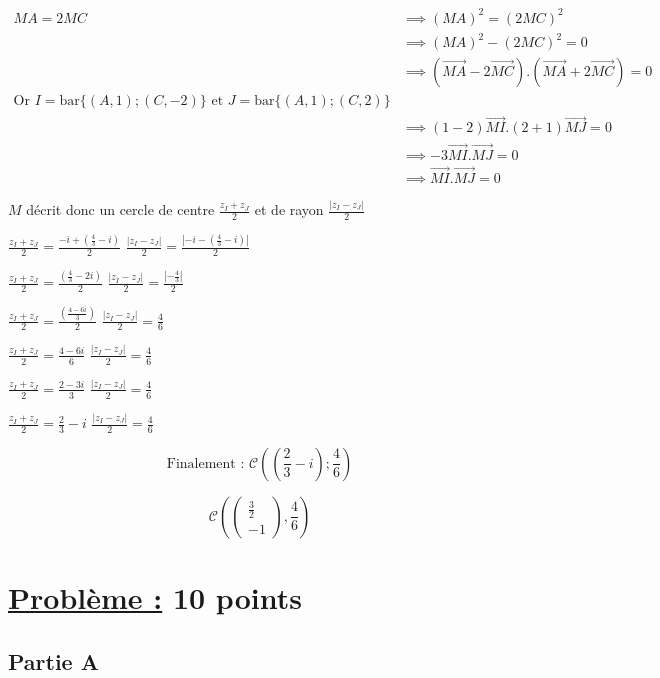 \documentclass[12pt,a4paper]{article}
\begin{document}
\begin{enumerate}
\begin{align*}
MA =2MC &\implies (MA)^{2} =(2MC)^{2}\\
				&\implies (MA)^{2} -(2MC)^{2}=0\\
				&\implies (\overrightarrow{MA} - 2\overrightarrow{MC}).(\overrightarrow{MA} + 2\overrightarrow{MC}) = 0\\
\text{Or }  I = \text{bar}\{(A,1); (C,-2)\} \text{ et } J = \text{bar}\{(A,1); (C,2)\}\\
				&\implies (1-2)\overrightarrow{MI}.(2+1)\overrightarrow{MJ} = 0\\
				&\implies -3\overrightarrow{MI}.\overrightarrow{MJ} = 0\\
				&\implies \overrightarrow{MI}.\overrightarrow{MJ} = 0
\end{align*}

\( M \) décrit donc un cercle de centre $\frac{z_I+z_J}{2}$ et de rayon $\frac{|z_I-z_J|}{2}$

$ \frac{z_I+z_J}{2} = \frac{ -i+\left( \frac{4}{3} - i\right) }{2} $  $\frac{|z_I-z_J|}{2}=\frac{|-i-\left( \frac{4}{3} - i\right)|}{2} $

$ \frac{z_I+z_J}{2} = \frac{ \left( \frac{4}{3} - 2i\right) }{2} $  $\frac{|z_I-z_J|}{2}=\frac{|-\frac{4}{3}|}{2} $

$ \frac{z_I+z_J}{2} = \frac{ \left( \frac{4 - 6i}{3}\right) }{2} $  $\frac{|z_I-z_J|}{2}=\frac{4}{6} $

$ \frac{z_I+z_J}{2} = \frac{4 - 6i}{6} $  $\frac{|z_I-z_J|}{2}=\frac{4}{6} $

$ \frac{z_I+z_J}{2} = \frac{2 - 3i}{3} $  $\frac{|z_I-z_J|}{2}=\frac{4}{6} $

$ \frac{z_I+z_J}{2} = \frac{2}{3}-i $  $\frac{|z_I-z_J|}{2}=\frac{4}{6} $

$$ \text{Finalement : } \boxed{\mathcal{C}\left( \left( \frac{2}{3}-i \right)  ;\frac{4}{6}\right)} $$

$$ \boxed{\mathcal{C} \left( \begin{pmatrix} \frac{3}{2} \\ -1 \end{pmatrix}, \frac{4}{6} \right)} $$
\end{enumerate}

\section*{\underline{Problème :} 10 points}

\subsection*{Partie A}
\end{document}
